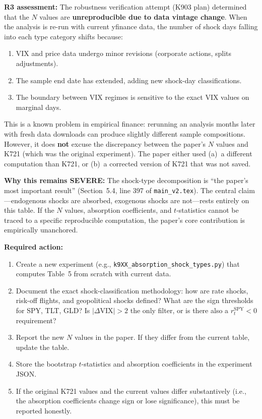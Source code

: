 \documentclass[12pt,a4paper]{article}
\begin{document}
\textbf{R3 assessment:} The robustness verification attempt (K903 plan) determined that the $N$ values are \textbf{unreproducible due to data vintage change}. When the analysis is re-run with current yfinance data, the number of shock days falling into each type category shifts because:
\begin{enumerate}[nosep]
\item VIX and price data undergo minor revisions (corporate actions, splits adjustments).
\item The sample end date has extended, adding new shock-day classifications.
\item The boundary between VIX regimes is sensitive to the exact VIX values on marginal days.
\end{enumerate}

This is a known problem in empirical finance: rerunning an analysis months later with fresh data downloads can produce slightly different sample compositions. However, it does \textbf{not} excuse the discrepancy between the paper's $N$ values and K721 (which was the original experiment). The paper either used (a)~a different computation than K721, or (b)~a corrected version of K721 that was not saved.

\textbf{Why this remains SEVERE:} The shock-type decomposition is ``the paper's most important result'' (Section~5.4, line 397 of \texttt{main\_v2.tex}). The central claim---endogenous shocks are absorbed, exogenous shocks are not---rests entirely on this table. If the $N$ values, absorption coefficients, and $t$-statistics cannot be traced to a specific reproducible computation, the paper's core contribution is empirically unanchored.

\textbf{Required action:}
\begin{enumerate}[nosep]
\item Create a new experiment (e.g., \texttt{k9XX\_absorption\_shock\_types.py}) that computes Table~5 from scratch with current data.
\item Document the exact shock-classification methodology: how are rate shocks, risk-off flights, and geopolitical shocks defined? What are the sign thresholds for SPY, TLT, GLD? Is $|\Delta\text{VIX}| > 2$ the only filter, or is there also a $r_t^{\text{SPY}} < 0$ requirement?
\item Report the new $N$ values in the paper. If they differ from the current table, update the table.
\item Store the bootstrap $t$-statistics and absorption coefficients in the experiment JSON.
\item If the original K721 values and the current values differ substantively (i.e., the absorption coefficients change sign or lose significance), this must be reported honestly.
\end{enumerate}
\end{document}
